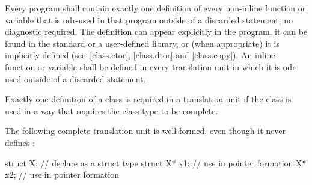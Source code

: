 \pnum
Every program shall contain exactly one definition of every non-inline
function or variable that is odr-used in that program
outside of a discarded statement; no diagnostic required.
The definition can appear explicitly in the program, it can be found in
the standard or a user-defined library, or (when appropriate) it is
implicitly defined (see~\ref{class.ctor}, \ref{class.dtor} and
\ref{class.copy}). An inline function or variable shall be defined in every
translation unit in which it is odr-used outside of a discarded statement.

\pnum
{}%
Exactly one definition of a class is required in a translation unit if
the class is used in a way that requires the class type to be complete.
\begin{example} The following complete translation unit is well-formed,
even though it never defines :

\begin{codeblock}
struct X;                       // declare  as a struct type
struct X* x1;                   // use  in pointer formation
X* x2;                          // use  in pointer formation
\end{codeblock}
\end{example}
